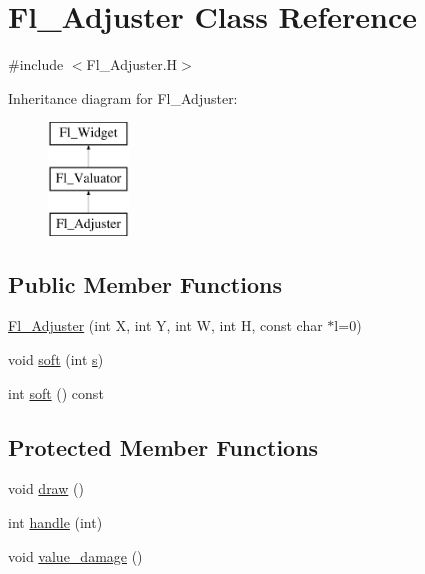 \hypertarget{class_fl___adjuster}{}\section{Fl\+\_\+\+Adjuster Class Reference}
\label{class_fl___adjuster}


{\ttfamily \#include $<$Fl\+\_\+\+Adjuster.\+H$>$}

Inheritance diagram for Fl\+\_\+\+Adjuster\+:\begin{figure}[H]
\begin{center}
\leavevmode
\includegraphics[height=3.000000cm]{class_fl___adjuster}
\end{center}
\end{figure}
\subsection*{Public Member Functions}
\begin{DoxyCompactItemize}
\item 
\hyperlink{class_fl___adjuster_a723dfaffe10c1a3947113f8df736dd72}{Fl\+\_\+\+Adjuster} (int X, int Y, int W, int H, const char $\ast$l=0)
\item 
void \hyperlink{class_fl___adjuster_a3cf531bc0d367428f38fa8f287af197e}{soft} (int \hyperlink{forms_8_h_a672b4f0a8c8a6db61068c721f799d87f}{s})
\item 
int \hyperlink{class_fl___adjuster_a40e5401a069d6f140e4a5636a852a28c}{soft} () const
\end{DoxyCompactItemize}
\subsection*{Protected Member Functions}
\begin{DoxyCompactItemize}
\item 
void \hyperlink{class_fl___adjuster_a6f34251b607ad461c8a03ab966ef5b21}{draw} ()
\item 
int \hyperlink{class_fl___adjuster_a0626b220caa4b81261c61b89ab2f7409}{handle} (int)
\item 
void \hyperlink{class_fl___adjuster_ab53a7e10eb85b94f1c305b1bbb9c1506}{value\+\_\+damage} ()
\end{DoxyCompactItemize}
